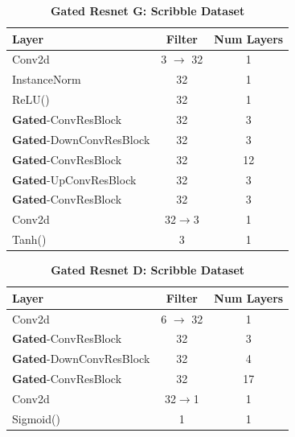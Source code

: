 \begin{table}[ht]
\caption{\textbf{Gated Resnet G: Scribble Dataset}}
\centering %
\begin{tabular}{l c c} %
\toprule%
\textbf{Layer} & \textbf{Filter} & \textbf{Num Layers} \\
\midrule
Conv2d & 3 $\rightarrow$ 32 & 1\\
InstanceNorm & 32 & 1 \\ %
ReLU() & 32 & 1\\
\hdashline%
\textbf{Gated}-ConvResBlock & 32 & 3\\
\textbf{Gated}-DownConvResBlock & 32 & 3\\
\textbf{Gated}-ConvResBlock & 32 & 12\\
\textbf{Gated}-UpConvResBlock & 32 & 3\\
\textbf{Gated}-ConvResBlock & 32 & 3\\
\hdashline
Conv2d & 32$\rightarrow$3 & 1 \\
Tanh() & 3 & 1 \\
\bottomrule%
\end{tabular}
\label{table:resnet_g_scribble} %
\end{table}

\begin{table}[ht]
\caption{\textbf{Gated Resnet D: Scribble Dataset}}
\centering %
\begin{tabular}{l c c} %
\toprule%
\textbf{Layer} & \textbf{Filter} & \textbf{Num Layers} \\
\midrule
Conv2d & 6 $\rightarrow$ 32 & 1\\
\hdashline%
\textbf{Gated}-ConvResBlock & 32 & 3\\
\textbf{Gated}-DownConvResBlock & 32 & 4\\
\textbf{Gated}-ConvResBlock & 32 & 17\\
\hdashline
Conv2d & 32$\rightarrow$1 & 1 \\
Sigmoid() & 1 & 1 \\
\bottomrule%
\end{tabular}
\label{table:resnet_d_scribble} %
\end{table}


